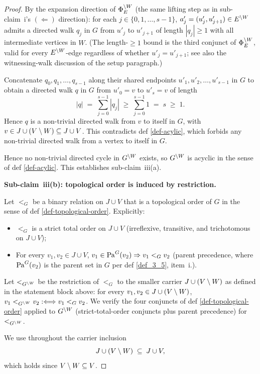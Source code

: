 \documentclass[main]{subfiles}
\begin{document}
\begin{proof}
By the expansion direction of $\Phi_E^{\setminus W}$ (the same lifting step as in sub-claim~i's $(\Leftarrow)$ direction): for each $j \in \{0, 1, \dots, s-1\}$, $a'_j = (u'_j, u'_{j+1}) \in E^{\setminus W}$ admits a directed walk $q_j$ in $G$ from $u'_j$ to $u'_{j+1}$ of length $|q_j| \ge 1$ with all intermediate vertices in $W$. (The length-$\ge 1$ bound is the third conjunct of $\Phi_E^{\setminus W}$, valid for every $E^{\setminus W}$-edge regardless of whether $u'_j = u'_{j+1}$; see also the witnessing-walk discussion of the setup paragraph.)

Concatenate $q_0, q_1, \dots, q_{s-1}$ along their shared endpoints $u'_1, u'_2, \dots, u'_{s-1}$ in $G$ to obtain a directed walk $q$ in $G$ from $u'_0 = v$ to $u'_s = v$ of length
\[
    |q| \;=\; \sum_{j=0}^{s-1} |q_j| \;\ge\; \sum_{j=0}^{s-1} 1 \;=\; s \;\ge\; 1.
\]
Hence $q$ is a non-trivial directed walk from $v$ to itself in $G$, with $v \in J \cup (V \setminus W) \subseteq J \cup V$. This contradicts def \ref{def-acylic}, which forbids any non-trivial directed walk from a vertex to itself in $G$.

Hence no non-trivial directed cycle in $G^{\setminus W}$ exists, so $G^{\setminus W}$ is acyclic in the sense of def \ref{def-acylic}. This establishes sub-claim~iii(a).

\medskip\noindent\textbf{Sub-claim~iii(b): topological order is induced by restriction.}

Let $<_G$ be a binary relation on $J \cup V$ that is a topological order of $G$ in the sense of def \ref{def-topological-order}. Explicitly:
\begin{itemize}
    \item $<_G$ is a strict total order on $J \cup V$ (irreflexive, transitive, and trichotomous on $J \cup V$);
    \item For every $v_1, v_2 \in J \cup V$, $v_1 \in \mathrm{Pa}^G(v_2) \Rightarrow v_1 <_G v_2$ (parent precedence, where $\mathrm{Pa}^G(v_2)$ is the parent set in $G$ per def \ref{def_3_5}, item~i.).
\end{itemize}
Let $<_{G^{\setminus W}}$ be the restriction of $<_G$ to the smaller carrier $J \cup (V \setminus W)$ as defined in the statement block above: for every $v_1, v_2 \in J \cup (V \setminus W)$, $v_1 <_{G^{\setminus W}} v_2 :\Longleftrightarrow v_1 <_G v_2$. We verify the four conjuncts of def \ref{def-topological-order} applied to $G^{\setminus W}$ (strict-total-order conjuncts plus parent precedence) for $<_{G^{\setminus W}}$.

\smallskip
We use throughout the carrier inclusion
\[
    J \cup (V \setminus W) \;\subseteq\; J \cup V,
\]
which holds since $V \setminus W \subseteq V$.


\end{proof}
\end{document}
